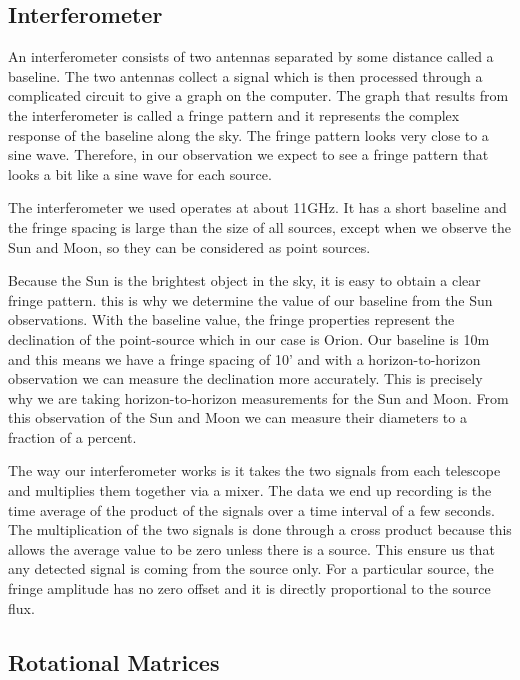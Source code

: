 \documentclass[12pt]{article}
\begin{document}
\subsection {Interferometer}
An interferometer consists of two antennas separated by some distance
called a baseline. The two antennas collect a signal which is then
processed through a complicated circuit to give a graph on the
computer. The graph that results from the interferometer is called a
fringe pattern and it represents the complex response of the baseline
along the sky. The fringe pattern looks very close to a sine
wave. Therefore, in our observation we expect to see a fringe pattern
that looks a bit like a sine wave for each source. 

The interferometer we used operates at about 11GHz. It has a short
baseline and the fringe spacing is large than the size of all sources,
except when we observe the Sun and Moon, so they can be considered as
point sources. 

Because the Sun is the brightest object in the sky, it is easy to obtain
a clear fringe pattern. this is why we determine the value of our
baseline from the Sun observations. With the baseline value, the fringe
properties represent the declination of the point-source which in our
case is Orion.  Our baseline is  10m and this means we have a fringe
spacing of 10' and with a horizon-to-horizon observation we can measure
the declination more accurately. This is precisely why we are taking
horizon-to-horizon measurements for the Sun and Moon. From this
observation of the Sun and Moon we can measure their diameters to a
fraction of a percent. 

The way our interferometer works is it takes the two signals from each
telescope and multiplies them together via a mixer. The data we end up
recording is the time average of the product of the signals over a time
interval of a few seconds. The multiplication of the two signals is done
through a cross product because this allows the average value to be zero
unless there is a source. This ensure us that any detected signal is
coming from the source only. For a particular source, the fringe
amplitude has no zero offset and it is directly proportional to the
source flux. 


\subsection {Rotational Matrices}
\end{document}
